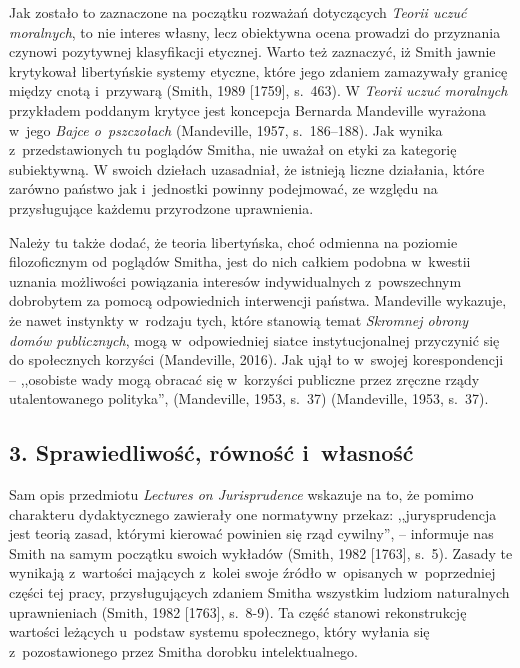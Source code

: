 \textbf{}Jak zostało to zaznaczone na początku rozważań dotyczących \textit{Teorii uczuć moralnych}, to nie interes własny, lecz obiektywna ocena prowadzi do przyznania czynowi pozytywnej klasyfikacji etycznej. Warto też zaznaczyć, iż Smith jawnie krytykował libertyńskie systemy etyczne, które jego zdaniem zamazywały granicę między cnotą i~przywarą \label{ref:RND6UVhftNekE}(Smith, 1989 [1759], s.~463). W \textit{Teorii uczuć moralnych} przykładem poddanym krytyce jest koncepcja Bernarda Mandeville wyrażona w~jego \textit{Bajce o~pszczołach} \label{ref:RNDhsq78lJp7f}(Mandeville, 1957, s.~186–188). Jak wynika z~przedstawionych tu poglądów Smitha, nie uważał on etyki za kategorię subiektywną. W swoich dziełach uzasadniał, że istnieją liczne działania, które zarówno państwo jak i~jednostki powinny podejmować, ze względu na przysługujące każdemu przyrodzone uprawnienia.

Należy tu także dodać, że teoria libertyńska, choć odmienna na poziomie filozoficznym od poglądów Smitha, jest do nich całkiem podobna w~kwestii uznania możliwości powiązania interesów indywidualnych z~powszechnym dobrobytem za pomocą odpowiednich interwencji państwa. Mandeville wykazuje, że nawet instynkty w~rodzaju tych, które stanowią temat \textit{Skromnej obrony domów publicznych}, mogą w~odpowiedniej siatce instytucjonalnej przyczynić się do społecznych korzyści \label{ref:RNDKGiGp2VVGh}(Mandeville, 2016). Jak ujął to w~swojej korespondencji -- ,,osobiste wady mogą obracać się w~korzyści publiczne przez zręczne rządy utalentowanego polityka'', \label{ref:RNDFxtQ9hz1QF}(Mandeville, 1953, s.~37) (Mandeville, 1953, s.~37).

\subsection[3. Sprawiedliwość, równość i~własność]{3. Sprawiedliwość, równość i~własność}

Sam opis przedmiotu \textit{Lectures on Jurisprudence} wskazuje na to, że pomimo charakteru dydaktycznego zawierały one normatywny przekaz: ,,jurysprudencja jest teorią zasad, którymi kierować powinien się rząd cywilny'', -- informuje nas Smith na samym początku swoich wykładów \label{ref:RNDscYVjbho0w}(Smith, 1982 [1763], s.~5). Zasady te wynikają z~wartości mających z~kolei swoje źródło w~opisanych w~poprzedniej części tej pracy, przysługujących zdaniem Smitha wszystkim ludziom naturalnych uprawnieniach \label{ref:RND2YqiGCGi5H}(Smith, 1982 [1763], s.~8-9). Ta część stanowi rekonstrukcję wartości leżących u~podstaw systemu społecznego, który wyłania się z~pozostawionego przez Smitha dorobku intelektualnego.

